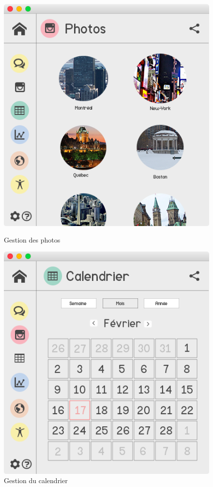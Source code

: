 \documentclass[11pt]{article}
\begin{document}
\begin{figure}[hbtp]
    \begin{minipage}[b]{0.4\linewidth}
        \centering \includegraphics[scale=0.43]{Modelisation/photos.png}
        \caption{Gestion des photos}
                \label{fig:photos}
\label{fig:base}
    \end{minipage}\hfill
    \begin{minipage}[b]{0.48\linewidth}
        \centering \includegraphics[scale=0.43]{Modelisation/calendrier.png}
        \caption{Gestion du calendrier}
        \label{fig:calendrier1}
    \end{minipage}
\end{figure}
\end{document}
